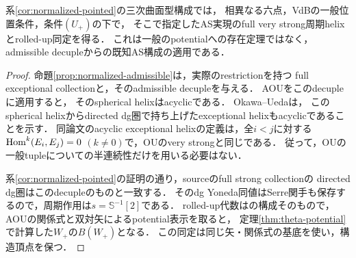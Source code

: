 \begin{proposition}[三次曲面の規格化構成でのhelix入力]\label{prop:cubic-helix-input}
系\ref{cor:normalized-pointed}の三次曲面型構成では，
相異なる六点，VdBの一般位置条件，条件$(U_+)$の下で，
そこで指定したAS実現のfull very strong周期helixとrolled-up同定を得る．
これは一般のpotentialへの存在定理ではなく，admissible decupleからの既知AS構成の適用である．
\end{proposition}
\begin{proof}
命題\ref{prop:normalized-admissible}は，実際のrestrictionを持つ
full exceptional collectionと，そのadmissible decupleを与える．
AOU\cite[Lemma 7.4とその直後]{AOU}をこのdecupleに適用すると，
そのspherical helixはacyclicである．
Okawa--Ueda\cite[Definition 4, Theorem 5]{OUHelices}は，
このspherical helixからdirected dg圏で持ち上げたexceptional helixもacyclicであることを示す．
同論文のacyclic exceptional helixの定義は，全$i<j$に対する
$\operatorname{Hom}^{k}(E_i,E_j)=0$ $(k\ne0)$で，OU\cite[Definition 3.1]{OU}のvery strongと同じである．
従って，OUの一般tupleについての半連続性だけを用いる必要はない．

系\ref{cor:normalized-pointed}の証明の通り，sourceのfull strong collectionの
directed dg圏はこのdecupleのものと一致する．
そのdg Yoneda同値はSerre関手も保存するので，周期作用は$s=\mathbb S^{-1}[2]$である．
rolled-up代数は\cite[(18)--(22)]{OUHelices}の構成そのもので，
AOU\cite[\S\S4.3--4.4, 7]{AOU}の関係式と双対矢によるpotential表示を取ると，
定理\ref{thm:theta-potential}で計算した$W_+$の$B(W_+)$となる．
この同定は同じ矢・関係式の基底を使い，構造頂点を保つ．
\end{proof}

